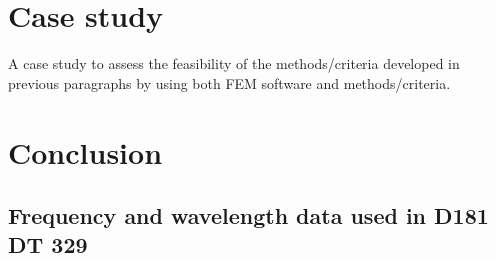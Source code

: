 
\chapter{Case study}

A case study to assess the feasibility of the methods/criteria developed in previous paragraphs by using both FEM software and methods/criteria. 


\chapter{Conclusion}


\begin{appendices}
\chapter{Frequency and wavelength data used in D181 DT 329}


\end{appendices}
